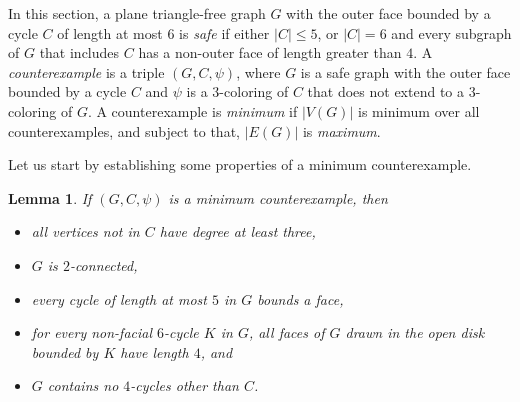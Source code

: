 \documentclass[12pt,twoside,openright,a4paper]{book}
\newtheorem{lemma}[theorem]{Lemma}
\begin{document}
In this section, a plane triangle-free graph $G$ with the outer face bounded by a cycle $C$ of length at most $6$
is \emph{safe} if either $|C|\le 5$, or $|C|=6$ and every subgraph of $G$ that includes $C$ has a non-outer face
of length greater than $4$.  A \emph{counterexample} is a triple $(G,C,\psi)$, where $G$ is a safe graph with
the outer face bounded by a cycle $C$ and $\psi$ is a $3$-coloring of $C$ that does not extend to a $3$-coloring of $G$.
A counterexample is \emph{minimum} if $|V(G)|$ is minimum over all counterexamples, and subject to that, $|E(G)|$ is \emph{maximum}.

Let us start by establishing some properties of a minimum counterexample.
\begin{lemma}\label{lemma:grgimprop}
If $(G,C,\psi)$ is a minimum counterexample, then
\begin{itemize}
\item[\textrm{(a)}] all vertices not in $C$ have degree at least three,
\item[\textrm{(b)}] $G$ is $2$-connected,
\item[\textrm{(c)}] every cycle of length at most $5$ in $G$ bounds a face, 
\item[\textrm{(d)}] for every non-facial $6$-cycle $K$ in $G$, all faces of
$G$ drawn in the open disk bounded by $K$ have length $4$, and
\item[\textrm{(e)}] $G$ contains no $4$-cycles other than $C$.
\end{itemize}
\end{lemma}
\end{document}
